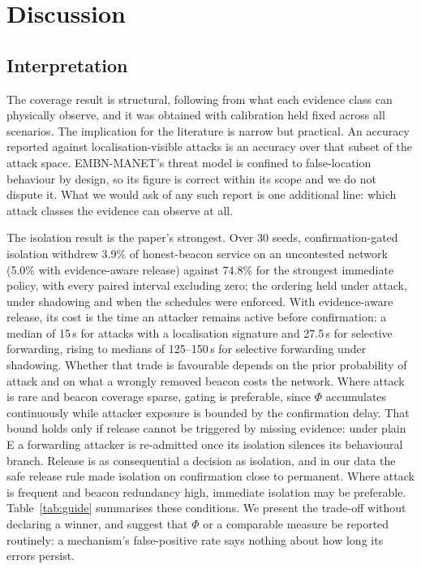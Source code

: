 \section{Discussion}
\label{sec:discussion}

\subsection{Interpretation}

The coverage result is structural, following from what each evidence class can
physically observe, and it was obtained
with calibration held fixed across all scenarios. The implication for the
literature is narrow but practical. An accuracy reported against
localisation-visible attacks is an accuracy over that subset of the attack
space. EMBN-MANET's threat model is confined to false-location behaviour by
design, so its figure is correct within its scope and we do not dispute it.
What we would ask of any such report is one additional line: which attack
classes the evidence can observe at all.

The isolation result is the paper's strongest. Over 30 seeds,
confirmation-gated isolation withdrew 3.9\% of honest-beacon service on an
uncontested network (5.0\% with evidence-aware release) against 74.8\% for
the strongest immediate policy, with every paired interval excluding zero; the
ordering held under attack, under shadowing and when the schedules were
enforced. With evidence-aware release, its cost is the time an attacker
remains active before confirmation: a median of 15\,s for attacks with a localisation
signature and 27.5\,s for selective forwarding, rising to medians of
125--150\,s for selective forwarding under shadowing. Whether that trade is favourable depends on
the prior probability of attack and on what a wrongly removed beacon costs the
network. Where attack is rare and beacon coverage sparse, gating is preferable,
since $\Phi$ accumulates continuously while attacker exposure is bounded by the
confirmation delay. That bound holds only if release cannot be triggered by
missing evidence: under plain E a forwarding attacker is re-admitted once its
isolation silences its behavioural branch. Release is as consequential a
decision as isolation, and in our data the safe release rule made isolation on
confirmation close to permanent. Where attack is frequent and beacon redundancy high,
immediate isolation may be preferable. Table~\ref{tab:guide} summarises
these conditions. We present the trade-off without declaring a winner, and
suggest that $\Phi$ or a comparable measure be reported routinely: a
mechanism's false-positive rate says nothing about how long its errors
persist.

